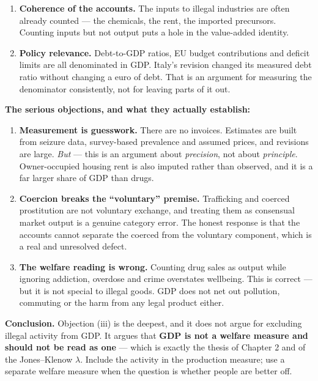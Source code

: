 \documentclass[12pt, letterpaper]{article}
\begin{document}
\begin{tcolorbox}[evenbox,title={Problem 1.4 \quad Drugs and Prostitution}]
\begin{enumerate}
\item \textbf{Coherence of the accounts.} The inputs to illegal industries are often already
counted --- the chemicals, the rent, the imported precursors. Counting inputs but not output
puts a hole in the value-added identity.

\item \textbf{Policy relevance.} Debt-to-GDP ratios, EU budget contributions and deficit
limits are all denominated in GDP. Italy's revision changed its measured debt ratio without
changing a euro of debt. That is an argument for measuring the denominator consistently, not
for leaving parts of it out.

\end{enumerate}

\textbf{The serious objections, and what they actually establish:}

\begin{enumerate}[label=(\roman*)]
\item \textbf{Measurement is guesswork.} There are no invoices. Estimates are built from
      seizure data, survey-based prevalence and assumed prices, and revisions are large.
      \emph{But} --- this is an argument about \emph{precision}, not about \emph{principle}.
      Owner-occupied housing rent is also imputed rather than observed, and it is a far
      larger share of GDP than drugs.
\item \textbf{Coercion breaks the ``voluntary'' premise.} Trafficking and coerced
      prostitution are not voluntary exchange, and treating them as consensual market output
      is a genuine category error. The honest response is that the accounts cannot separate
      the coerced from the voluntary component, which is a real and unresolved defect.
\item \textbf{The welfare reading is wrong.} Counting drug sales as output while ignoring
      addiction, overdose and crime overstates wellbeing. This is correct --- but it is not
      special to illegal goods. GDP does not net out pollution, commuting or the harm from
      any legal product either.
\end{enumerate}

\textbf{Conclusion.} Objection (iii) is the deepest, and it does not argue for excluding
illegal activity from GDP. It argues that \textbf{GDP is not a welfare measure and should
not be read as one} --- which is exactly the thesis of Chapter 2 and of the Jones--Klenow
$\lambda$. Include the activity in the production measure; use a separate welfare measure
when the question is whether people are better off.
\end{tcolorbox}
\end{document}
